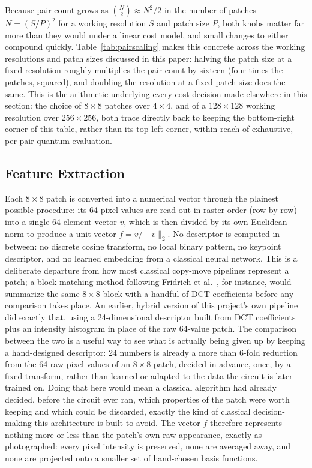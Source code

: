 \documentclass[conference]{IEEEtran}
\begin{document}
Because pair count grows as $\binom{N}{2} \approx N^2/2$ in the number of patches $N = (S/P)^2$ for a working resolution $S$ and patch size $P$, both knobs matter far more than they would under a linear cost model, and small changes to either compound quickly. Table~\ref{tab:pairscaling} makes this concrete across the working resolutions and patch sizes discussed in this paper: halving the patch size at a fixed resolution roughly multiplies the pair count by sixteen (four times the patches, squared), and doubling the resolution at a fixed patch size does the same. This is the arithmetic underlying every cost decision made elsewhere in this section: the choice of $8\times8$ patches over $4\times4$, and of a $128\times128$ working resolution over $256\times256$, both trace directly back to keeping the bottom-right corner of this table, rather than its top-left corner, within reach of exhaustive, per-pair quantum evaluation.

\subsection{Feature Extraction}\label{sec:features}
Each $8\times8$ patch is converted into a numerical vector through the plainest possible procedure: its 64 pixel values are read out in raster order (row by row) into a single 64-element vector $v$, which is then divided by its own Euclidean norm to produce a unit vector $f = v/\|v\|_2$. No descriptor is computed in between: no discrete cosine transform, no local binary pattern, no keypoint descriptor, and no learned embedding from a classical neural network. This is a deliberate departure from how most classical copy-move pipelines represent a patch; a block-matching method following Fridrich et al.~\cite{fridrich2003}, for instance, would summarize the same $8\times8$ block with a handful of DCT coefficients before any comparison takes place. An earlier, hybrid version of this project's own pipeline did exactly that, using a 24-dimensional descriptor built from DCT coefficients plus an intensity histogram in place of the raw 64-value patch. The comparison between the two is a useful way to see what is actually being given up by keeping a hand-designed descriptor: 24 numbers is already a more than 6-fold reduction from the 64 raw pixel values of an $8\times8$ patch, decided in advance, once, by a fixed transform, rather than learned or adapted to the data the circuit is later trained on. Doing that here would mean a classical algorithm had already decided, before the circuit ever ran, which properties of the patch were worth keeping and which could be discarded, exactly the kind of classical decision-making this architecture is built to avoid. The vector $f$ therefore represents nothing more or less than the patch's own raw appearance, exactly as photographed: every pixel intensity is preserved, none are averaged away, and none are projected onto a smaller set of hand-chosen basis functions.
\end{document}
